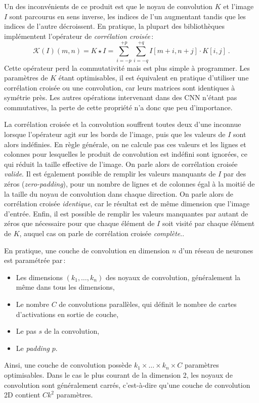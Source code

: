 Un des inconvénients de ce produit est que le noyau de convolution $K$ et l'image $I$ sont parcourus en sens inverse, les indices de l'un augmentant tandis que les indices de l'autre décroissent. En pratique, la plupart des bibliothèques implémentent l'opérateur de \emph{corrélation croisée}\,:
$$\mathcal{K}(I)(m,n) = K \star I = \sum_{i=-p}^{+p} \sum_{i=-q}^{+q} I[m + i, n + j] \cdot K[i, j]~.$$
Cette opérateur perd la commutativité mais est plus simple à programmer. Les paramètres de $K$ étant optimisables, il est équivalent en pratique d'utiliser une corrélation croisée ou une convolution, car leurs matrices sont identiques à symétrie près. Les autres opérations intervenant dans des \gls{CNN} n'étant pas commutatives, la perte de cette propriété n'a donc que peu d'importance.

La corrélation croisée et la convolution souffrent toutes deux d'une inconnue lorsque l'opérateur agit sur les bords de l'image, puis que les valeurs de $I$ sont alors indéfinies. En règle générale, on ne calcule pas ces valeurs et les lignes et colonnes pour lesquelles le produit de convolution est indéfini sont ignorées, ce qui réduit la taille effective de l'image. On parle alors de corrélation croisée \emph{valide}. Il est également possible de remplir les valeurs manquants de $I$ par des zéros (\emph{zero-padding}), pour un nombre de lignes et de colonnes égal à la moitié de la taille du noyau de convolution dans chaque direction. On parle alors de corrélation croisée \emph{identique}, car le résultat est de même dimension que l'image d'entrée. Enfin, il est possible de remplir les valeurs manquantes par autant de zéros que nécessaire pour que chaque élément de $I$ soit visité par chaque élément de $K$, auquel cas on parle de corrélation croisée \emph{complète}..

En pratique, une couche de convolution en dimension $n$ d'un réseau de neurones est paramétrée par\,:
\begin{itemize}
  \item Les dimensions $(k_1, \dots, k_n)$ des noyaux de convolution, généralement la même dans tous les dimensions,
  \item Le nombre $C$ de convolutions parallèles, qui définit le nombre de cartes d'activations en sortie de couche,
  \item Le pas $s$ de la convolution,
  \item Le \emph{padding} $p$.
\end{itemize}

Ainsi, une couche de convolution possède $k_1 \times \dots \times k_n \times C$ paramètres optimisables. Dans le cas le plus courant de la dimension 2, les noyaux de convolution sont généralement carrés, c'est-à-dire qu'une couche de convolution 2D contient $C k^2$ paramètres.


